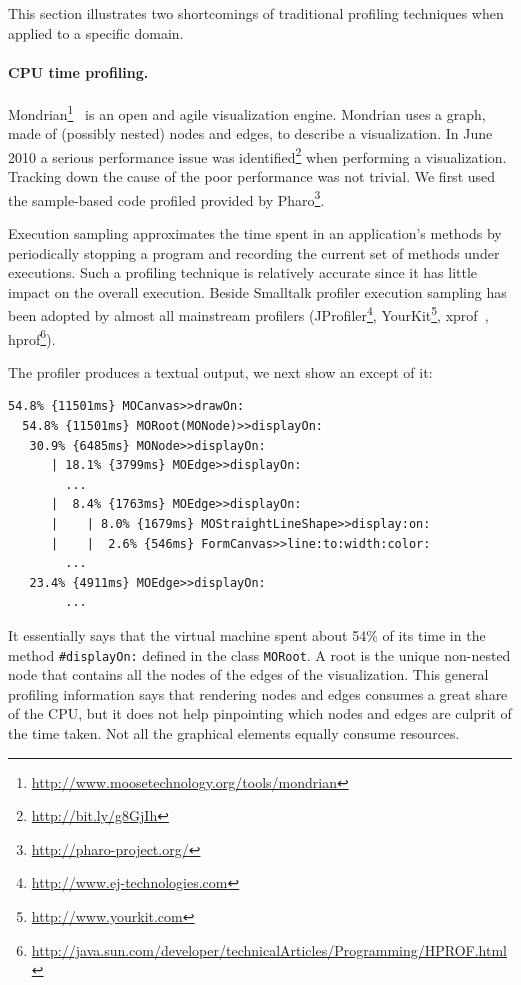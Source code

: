 \documentclass[runningheads]{llncs}
\newcommand{\ct}{\lstinline[backgroundcolor=\color{white},basicstyle=\footnotesize\ttfamily]}
\newcommand{\lr}[1]{\nb{Lukas}{orange}{#1}}
\begin{document}
This section illustrates two shortcomings of traditional profiling techniques when applied to a specific domain.\\

\paragraph{CPU time profiling.}
Mondrian\footnote{\url{http://www.moosetechnology.org/tools/mondrian}}~\cite{Meye06a} is an open and agile visualization engine. 
Mondrian uses a graph, made of (possibly nested) nodes and edges, to describe a visualization. 
In June 2010 a serious performance issue was identified\footnote{\lr{again?} \url{http://bit.ly/g8GjIh}} when performing a visualization.
Tracking down the cause of the poor performance was not trivial. We first used the sample-based code profiled provided by Pharo\footnote{\url{http://pharo-project.org/}}.

Execution sampling approximates the time spent in an application's methods by periodically stopping a program and recording the current set of methods under executions. Such a profiling technique is relatively accurate since it has little impact on the overall execution.
Beside Smalltalk profiler execution sampling has been adopted by almost all mainstream profilers (JProfiler\footnote{\url{http://www.ej-technologies.com}}, YourKit\footnote{\url{http://www.yourkit.com}}, xprof~\cite{Gupt92a}, hprof\footnote{\url{http://java.sun.com/developer/technicalArticles/Programming/HPROF.html}}).

The profiler produces a textual output, we next show an except of it:

\begin{lstlisting}
54.8% {11501ms} MOCanvas>>drawOn: 
  54.8% {11501ms} MORoot(MONode)>>displayOn: 
   30.9% {6485ms} MONode>>displayOn: 
      | 18.1% {3799ms} MOEdge>>displayOn: 
     	...    
      |  8.4% {1763ms} MOEdge>>displayOn: 
      |    | 8.0% {1679ms} MOStraightLineShape>>display:on: 
      |    |  2.6% {546ms} FormCanvas>>line:to:width:color: 
    	...    
   23.4% {4911ms} MOEdge>>displayOn: 	
        ...    
\end{lstlisting}

It essentially says that the virtual machine spent about 54\% of its time in the method \ct{#displayOn:} defined in the class \ct{MORoot}. A root is the unique non-nested node that contains all the nodes of the edges of the visualization. This general profiling information says that rendering nodes and edges consumes a great share of the CPU, but it does not help pinpointing which nodes and edges are culprit of the time taken. Not all the graphical elements equally consume resources.
\end{document}
